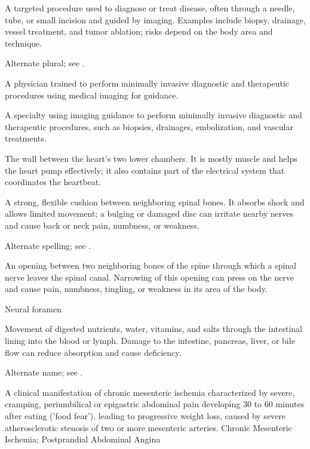  A targeted procedure used to diagnose or treat disease, often through a needle, tube, or small incision and guided by imaging. Examples include biopsy, drainage, vessel treatment, and tumor ablation; risks depend on the body area and technique.

 Alternate plural; see .

 A physician trained to perform minimally invasive diagnostic and therapeutic procedures using medical imaging for guidance.

 A specialty using imaging guidance to perform minimally invasive diagnostic and therapeutic procedures, such as biopsies, drainages, embolization, and vascular treatments.

 The wall between the heart’s two lower chambers. It is mostly muscle and helps the heart pump effectively; it also contains part of the electrical system that coordinates the heartbeat.

 A strong, flexible cushion between neighboring spinal bones. It absorbs shock and allows limited movement; a bulging or damaged disc can irritate nearby nerves and cause back or neck pain, numbness, or weakness.

 Alternate spelling; see .

 An opening between two neighboring bones of the spine through which a spinal nerve leaves the spinal canal. Narrowing of this opening can press on the nerve and cause pain, numbness, tingling, or weakness in its area of the body.

\synonyms
Neural foramen

 Movement of digested nutrients, water, vitamins, and salts through the intestinal lining into the blood or lymph. Damage to the intestine, pancreas, liver, or bile flow can reduce absorption and cause deficiency.

 Alternate name; see .

 A clinical manifestation of chronic mesenteric ischemia characterized by severe, cramping, periumbilical or epigastric abdominal pain developing 30 to 60 minutes after eating ('food fear'), leading to progressive weight loss, caused by severe atherosclerotic stenosis of two or more mesenteric arteries.
\synonyms
Chronic Mesenteric Ischemia; Postprandial Abdominal Angina

